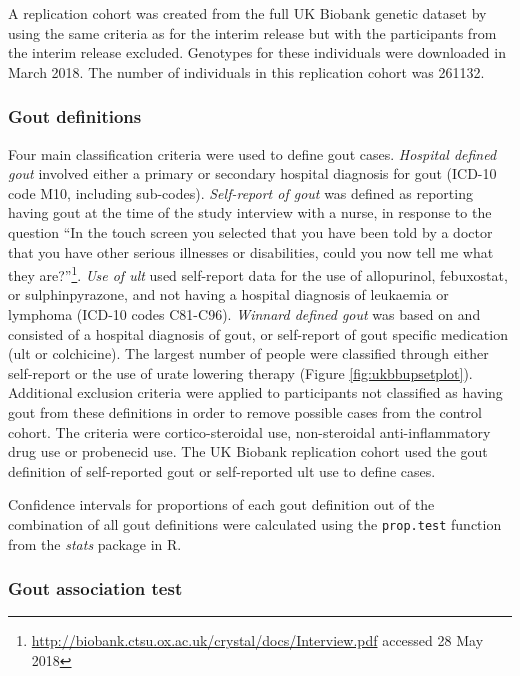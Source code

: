 \documentclass[]{report}
\begin{document}
A replication cohort was created from the full UK Biobank genetic
dataset by using the same criteria as for the interim release but with
the participants from the interim release excluded. Genotypes for these
individuals were downloaded in March 2018. The number of individuals in
this replication cohort was 261132.

\subsubsection{Gout definitions}\label{gout-definitions}

Four main classification criteria were used to define gout cases.
\emph{Hospital defined gout} involved either a primary or secondary
hospital diagnosis for gout (ICD-10 code M10, including sub-codes).
\emph{Self-report of gout} was defined as reporting having gout at the
time of the study interview with a nurse, in response to the question
``In the touch screen you selected that you have been told by a doctor
that you have other serious illnesses or disabilities, could you now
tell me what they are?''\footnote{\url{http://biobank.ctsu.ox.ac.uk/crystal/docs/Interview.pdf}
  accessed 28 May 2018}. \emph{Use of \gls{ult}} used self-report data
for the use of allopurinol, febuxostat, or sulphinpyrazone, and not
having a hospital diagnosis of leukaemia or lymphoma (ICD-10 codes
C81-C96). \emph{Winnard defined gout} was based on \citet{Winnard2012}
and consisted of a hospital diagnosis of gout, or self-report of gout
specific medication (\gls{ult} or colchicine). The largest number of
people were classified through either self-report or the use of urate
lowering therapy (Figure \ref{fig:ukbbupsetplot}). Additional exclusion
criteria were applied to participants not classified as having gout from
these definitions in order to remove possible cases from the control
cohort. The criteria were cortico-steroidal use, non-steroidal
anti-inflammatory drug use or probenecid use. The UK Biobank replication
cohort used the gout definition of self-reported gout or self-reported
\gls{ult} use to define cases.

Confidence intervals for proportions of each gout definition out of the
combination of all gout definitions were calculated using the
\texttt{prop.test} function from the \emph{stats} package in R.

\subsubsection{Gout association test}\label{gout-association-test}
\end{document}
